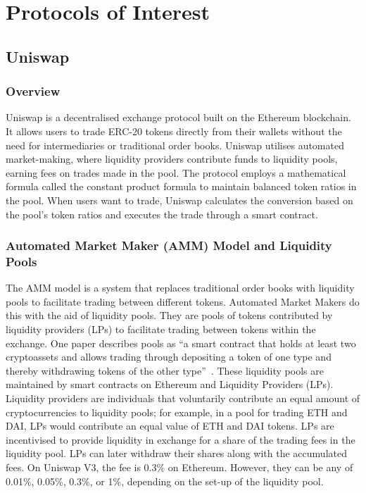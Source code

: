 \section{Protocols of Interest}
\subsection{Uniswap}

\subsubsection{Overview}
Uniswap is a decentralised exchange protocol built on the Ethereum blockchain. It allows users to trade ERC-20 tokens directly from their wallets without the need for intermediaries or traditional order books. Uniswap utilises automated market-making, where liquidity providers contribute funds to liquidity pools, earning fees on trades made in the pool. The protocol employs a mathematical formula called the constant product formula to maintain balanced token ratios in the pool. When users want to trade, Uniswap calculates the conversion based on the pool's token ratios and executes the trade through a smart contract.

\subsubsection{Automated Market Maker (AMM) Model and Liquidity Pools}

The AMM model is a system that replaces traditional order books with liquidity pools to facilitate trading between different tokens. Automated Market Makers do this with the aid of liquidity pools. They are pools of tokens contributed by liquidity providers (LPs) to facilitate trading between tokens within the exchange. One paper describes pools as ``a smart contract that holds at least two cryptoassets and allows trading through depositing a token of one type and thereby withdrawing tokens of the other type''~\cite{schar2021decentralized}. These liquidity pools are maintained by smart contracts on Ethereum and Liquidity Providers (LPs). Liquidity providers are individuals that voluntarily contribute an equal amount of cryptocurrencies to liquidity pools; for example, in a pool for trading ETH and DAI, LPs would contribute an equal value of ETH and DAI tokens. LPs are incentivised to provide liquidity in exchange for a share of the trading fees in the liquidity pool. LPs can later withdraw their shares along with the accumulated fees. On Uniswap V3, the fee is 0.3\% on Ethereum. However, they can be any of 0.01\%, 0.05\%, 0.3\%, or 1\%, depending on the set-up of the liquidity pool.

